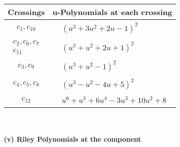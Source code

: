\documentclass[1p]{elsarticle_modified}
\theoremstyle{definition}
\begin{document}
\begin{tabular}{m{50pt}|m{274pt}}
Crossings & \hspace{64pt}u-Polynomials at each crossing \\
\hline $$\begin{aligned}c_{1},c_{10}\end{aligned}$$&$\begin{aligned}
&(u^3+3 u^2+2 u-1)^2
\end{aligned}$\\
\hline $$\begin{aligned}c_{2},c_{6},c_{7}\\c_{11}\end{aligned}$$&$\begin{aligned}
&(u^3+u^2+2 u+1)^2
\end{aligned}$\\
\hline $$\begin{aligned}c_{3},c_{9}\end{aligned}$$&$\begin{aligned}
&(u^3+u^2-1)^2
\end{aligned}$\\
\hline $$\begin{aligned}c_{4},c_{5},c_{8}\end{aligned}$$&$\begin{aligned}
&(u^3- u^2-4 u+5)^2
\end{aligned}$\\
\hline $$\begin{aligned}c_{12}\end{aligned}$$&$\begin{aligned}
&u^6+u^5+6 u^4-3 u^3+10 u^2+8
\end{aligned}$\\
\hline
\end{tabular}\\~\\
\newpage\renewcommand{\arraystretch}{1}
\flushleft \textbf{(v) Riley Polynomials at the component}\newline \\
\end{document}
